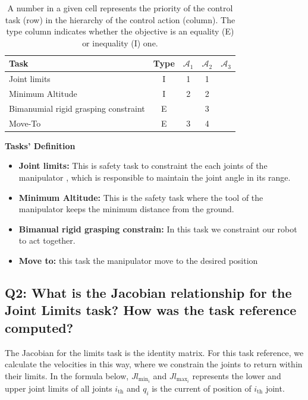 \documentclass{article}
\begin{document}
\begin{table}[htb]
	\label{tbl:actions_tables}
	\begin{center}
		\footnotesize
		\begin{tabular}{lcccc}
			\toprule		
			Task & Type & $\mathcal{A}_{1}$ & $\mathcal{A}_{2}$  & $\mathcal{A}_{3}$  \\
			\midrule
			Joint limits                      & I & 1 & 1 &  \\
			\hdashline
			Minimum Altitude						& I & 2& 2 & \\
			\hdashline 
			Bimanumial rigid grasping constraint					& E & & 3 & \\
			\hdashline
			Move-To						& E & 3 & 4& \\ 
			
			\bottomrule
		\end{tabular}
	\end{center}
\caption{A number in a given cell represents the priority of the control task (row) in the hierarchy of the control action (column). The type column indicates whether the objective is an equality (E) or inequality (I) one.}
\end{table}
\noindent
\textbf{Tasks' Definition}
\begin{itemize}
	\item \textbf{Joint limits:} This is safety task to constraint the each joints of the manipulator , which is responsible to maintain the joint angle in its range.
	\item \textbf{Minimum Altitude:} This is the safety task where the tool of the manipulator keeps the minimum distance from the ground. 
	\item \textbf{Bimanual rigid grasping constrain:} In this task we constraint our robot to act together. 
	\item \textbf{Move to:} this task the manipulator move to the desired position 
\end{itemize}

\subsection{Q2: What is the Jacobian relationship for the Joint Limits task? How was the task reference computed?}
The Jacobian for the limits task is the identity matrix. For this task reference, we calculate the velocities in this way, where we constrain the joints to return within their limits. In the formula below,  $Jl_{\text{min}_i}$ and $Jl_{\text{max}_i}$  represents the lower and upper joint limits of all joints  $i_{\text{th}}$ and $q_i$ is the current of position of $i_{\text{th}}$ joint.
\end{document}
